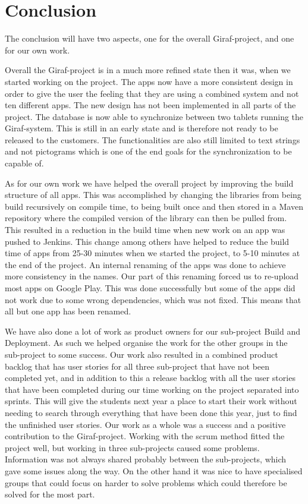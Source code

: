 \chapter{Conclusion} \label{ChapConclusion}
The conclusion will have two aspects, one for the overall Giraf-project, and one for our own work.

Overall the Giraf-project is in a much more refined state then it was, when we started working on the project.
The apps now have a more consistent design in order to give the user the feeling that they are using a combined system and not ten different apps. The new design has not been implemented in all parts of the project.
The database is now able to synchronize between two tablets running the Giraf-system. This is still in an early state and is therefore not ready to be released to the customers. The functionalities are also still limited to text strings and not pictograms which is one of the end goals for the synchronization to be capable of.

As for our own work we have helped the overall project by improving the build structure of all apps. This was accomplished by changing the libraries from being build recursively on compile time, to being built once and then stored in a Maven repository where the compiled version of the library can then be pulled from. This resulted in a reduction in the build time when new work on an app was pushed to Jenkins. This change among others have helped to reduce the build time of apps from 25-30 minutes when we started the project, to 5-10 minutes at the end of the project. 
An internal renaming of the apps was done to achieve more consistency in the names. Our part of this renaming forced us to re-upload most apps on Google Play. This was done successfully but some of the apps did not work due to some wrong dependencies, which was not fixed. This means that all but one app has been renamed.

We have also done a lot of work as product owners for our sub-project Build and Deployment. As such we helped organise the work for the other groups in the sub-project to some success. Our work also resulted in a combined product backlog that has user stories for all three sub-project that have not been completed yet, and in addition to this a release backlog with all the user stories that have been completed during our time working on the project separated into sprints. This will give the students next year a place to start their work without needing to search through everything that have been done this year, just to find the unfinished user stories.
Our work as a whole was a success and a positive contribution to the Giraf-project. Working with the scrum method fitted the project well, but working in three sub-projects caused some problems. Information was not always shared probably between the sub-projects, which gave some issues along the way. On the other hand it was nice to have specialised groups that could focus on harder to solve problems which could therefore be solved for the most part.
